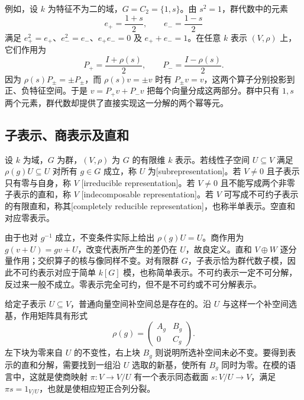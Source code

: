 \ProseParagraphBreak
例如，设 \(k\) 为特征不为二的域，\(G=C_2=\{1,s\}\)。由 \(s^2=1\)，群代数中的元素
\[
	e_+=\frac{1+s}{2},\qquad e_-=\frac{1-s}{2}
\]
满足 \(e_+^2=e_+\)、\(e_-^2=e_-\)、\(e_+e_-=0\) 及 \(e_++e_-=1\)。在任意 \(k\) 表示 \((V,\rho)\) 上，它们作用为
\[
	P_+=\frac{I+\rho(s)}2,\qquad P_-=\frac{I-\rho(s)}2.
\]
因为 \(\rho(s)P_\pm=\pm P_\pm\)，而 \(\rho(s)v=\pm v\) 时有 \(P_\pm v=v\)，这两个算子分别投影到正、负特征空间。于是 \(v=P_+v+P_-v\) 把每个向量分成这两部分。群中只有 \(1,s\) 两个元素，群代数却提供了直接实现这一分解的两个幂等元。

\subsection{子表示、商表示及直和}
\label{b5:subsec:0101:03}

\begin{definition}\label{b5:def:subrepresentation-semisimple}
	设 \(k\) 为域，\(G\) 为群，\((V,\rho)\) 为 \(G\) 的有限维 \(k\) 表示。若线性子空间 \(U\subseteq V\) 满足 \(\rho(g)U\subseteq U\) 对所有 \(g\in G\) 成立，称 \(U\) 为[subrepresentation]。若 \(V\ne0\) 且子表示只有零与自身，称 \(V\) [irreducible representation]。若 \(V\ne0\) 且不能写成两个非零子表示的直和，称 \(V\) [indecomposable representation]。若 \(V\) 可写成不可约子表示的有限直和，称其[completely reducible representation]，也称半单表示。空直和对应零表示。
\end{definition}

由于也对 \(g^{-1}\) 成立，不变条件实际上给出 \(\rho(g)U=U\)。商作用为 \(g(v+U)=gv+U\)，改变代表所产生的差仍在 \(U\)，故良定义。直和 \(V\oplus W\) 逐分量作用；交织算子的核与像同样不变。对有限群 \(G\)，子表示恰为群代数子模，因此不可约表示对应于简单 \(k[G]\) 模，也称简单表示。不可约表示一定不可分解，反过来一般不成立。零表示完全可约，但不是不可约或不可分解表示。

\ProseParagraphBreak
给定子表示 \(U\subseteq V\)，普通向量空间补空间总是存在的。沿 \(U\) 与这样一个补空间选基，作用矩阵具有形式
\[
	\rho(g)=\begin{pmatrix}A_g&B_g\\0&C_g\end{pmatrix}.
\]
左下块为零来自 \(U\) 的不变性，右上块 \(B_g\) 则说明所选补空间未必不变。要得到表示的直和分解，需要找到一组沿 \(U\) 选取的新基，使所有 \(B_g\) 同时为零。在模的语言中，这就是使商映射 \(\pi:V\to V/U\) 有一个表示同态截面 \(s:V/U\to V\)，满足 \(\pi s=1_{V/U}\)，也就是使相应短正合列分裂。


